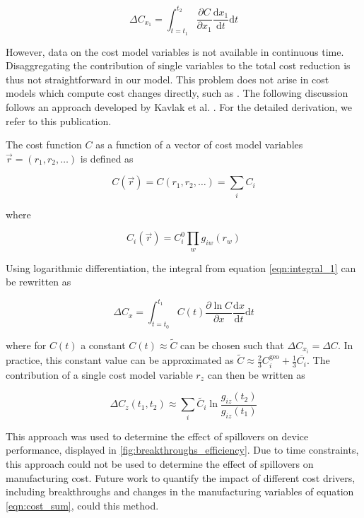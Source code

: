 \documentclass[10pt]{article}
\begin{document}
\begin{equation}
\Delta C_{x_1} = \int_{t=t_1}^{t_2} \frac{\partial C }{\partial x_1} \frac{\text{d}x_1}{\text{d}t} \text{d}t
\label{eqn:integral_1}
\end{equation}

However, data on the cost model variables is not available in continuous time. Disaggregating the contribution of single variables to the total cost reduction is thus not straightforward in our model. This problem does not arise in cost models which compute cost changes directly, such as \cite{nemet2012solar} \cite{goodrich2013assessing}. The following discussion follows an approach developed by Kavlak et al. \cite{kavlak2018evaluating}. For the detailed derivation, we refer to this publication.

The cost function $C$ as a function of a vector of cost model variables $\vec{r}=(r_1,r_2,\dots)$ is defined as

\begin{equation}
C(\vec{r}) = C(r_1,r_2, \dots) = \sum_i C_i
\end{equation}

where

\begin{equation}
C_i(\vec{r}) = C_i^0 \prod_w g_{iw}(r_w)
\end{equation}

Using logarithmic differentiation, the integral from equation \cref{eqn:integral_1} can be rewritten as

\begin{equation}
\Delta C_x = \int_{t=t_0}^{t_1} C(t) \frac{ \partial \ln C }{ \partial x } \frac{ \text{d} x }{ \text{d} t} \text{d} t
\end{equation}

where for $C(t)$ a constant $C(t) \approx \tilde{C} $ can be chosen such that $\Delta C_{x_i} = \Delta C$. In practice, this constant value can be approximated as $\tilde{C} \approx \frac{2}{3} C_i^\text{geo} + \frac{1}{3} \overline{C_i}$. The contribution of a single cost model variable $r_z$ can then be written as

\begin{equation}
\Delta C_z (t_1,t_2) \approx \sum_i \tilde{C_i} \ln \frac{g_{iz}(t_2)}{g_{iz}(t_1)}
\end{equation}

This approach was used to determine the effect of spillovers on device performance, displayed in  \cref{fig:breakthroughs_efficiency}. Due to time constraints, this approach could not be used to determine the effect of spillovers on manufacturing cost. Future work to quantify the impact of different cost drivers, including breakthroughs and changes in the manufacturing variables of equation \cref{eqn:cost_sum}, could this method.
\end{document}

